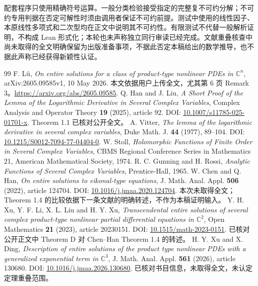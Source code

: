 \documentclass[UTF8,11pt,a4paper,fontset=fandol]{ctexart}
\theoremstyle{definition}\newtheorem{definition}[theorem]{定义}
\theoremstyle{remark}\newtheorem{remark}[theorem]{注}
\newcommand{\C}{\mathbb C}\newcommand{\N}{\mathbb N}
\begin{document}
配套程序只使用精确符号运算。一般分类检验接受指定的完整复不可约分解；不可约专用判据在否定可解性时须由调用者保证不可约前提。测试中使用的线性因子、本原线性多项式和二次型均在正文中说明其不可约性。有限测试不代替一般解析证明，不构成 Lean 形式化；本轮也未声称独立同行审读已经完成。文献重叠核查中尚未取得的全文明确保留为出版准备事项，不据此否定本稿给出的数学推导，也不据此声称已经获得新颖性认证。

\begin{thebibliography}{99}
 F. L\"u, \emph{On entire solutions for a class of product-type nonlinear PDEs in $\C^n$}, arXiv:2605.09585v1, 10 May 2026. 本文依据用户上传全文，尤其第 6 页 Remark 3。\url{https://arxiv.org/abs/2605.09585}.
 Q. Han and J. Liu, \emph{A Short Proof of the Lemma of the Logarithmic Derivative in Several Complex Variables}, Complex Analysis and Operator Theory \textbf{19} (2025), article 92. DOI: \href{https://doi.org/10.1007/s11785-025-01701-x}{10.1007/s11785-025-01701-x}. Theorem 1.1 已核对公开全文。
 A. Vitter, \emph{The lemma of the logarithmic derivative in several complex variables}, Duke Math. J. \textbf{44} (1977), 89--104. DOI: \href{https://doi.org/10.1215/S0012-7094-77-04404-0}{10.1215/S0012-7094-77-04404-0}.
 W. Stoll, \emph{Holomorphic Functions of Finite Order in Several Complex Variables}, CBMS Regional Conference Series in Mathematics 21, American Mathematical Society, 1974.
 R. C. Gunning and H. Rossi, \emph{Analytic Functions of Several Complex Variables}, Prentice-Hall, 1965.
 W. Chen and Q. Han, \emph{On entire solutions to eikonal-type equations}, J. Math. Anal. Appl. \textbf{506} (2022), article 124704. DOI: \href{https://doi.org/10.1016/j.jmaa.2020.124704}{10.1016/j.jmaa.2020.124704}. 本次未取得全文；Theorem 1.4 的比较依据下一条文献的明确转述，不作为本稿证明输入。
 Y. H. Xu, Y. F. Li, X. L. Liu and H. Y. Xu, \emph{Transcendental entire solutions of several complex product-type nonlinear partial differential equations in $\C^2$}, Open Mathematics \textbf{21} (2023), article 20230151. DOI: \href{https://doi.org/10.1515/math-2023-0151}{10.1515/math-2023-0151}. 已核对公开正文中 Theorem D 对 Chen--Han Theorem 1.4 的转述。
 H. Y. Xu and X. Ding, \emph{Description of entire solutions of the product type nonlinear PDEs with a generalized exponential term in $\C^3$}, J. Math. Anal. Appl. \textbf{561} (2026), article 130680. DOI: \href{https://doi.org/10.1016/j.jmaa.2026.130680}{10.1016/j.jmaa.2026.130680}. 已核对书目信息，未取得全文，未认定定理重叠范围。
\end{thebibliography}
\end{document}
